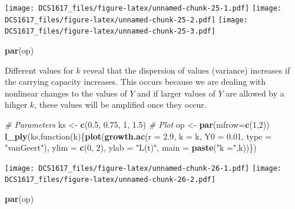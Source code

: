 \documentclass[]{book}
\newenvironment{Shaded}{\begin{snugshade}}{\end{snugshade}}
\newcommand{\KeywordTok}[1]{\textcolor[rgb]{0.13,0.29,0.53}{\textbf{{#1}}}}
\newcommand{\DataTypeTok}[1]{\textcolor[rgb]{0.13,0.29,0.53}{{#1}}}
\newcommand{\DecValTok}[1]{\textcolor[rgb]{0.00,0.00,0.81}{{#1}}}
\newcommand{\FloatTok}[1]{\textcolor[rgb]{0.00,0.00,0.81}{{#1}}}
\newcommand{\StringTok}[1]{\textcolor[rgb]{0.31,0.60,0.02}{{#1}}}
\newcommand{\CommentTok}[1]{\textcolor[rgb]{0.56,0.35,0.01}{\textit{{#1}}}}
\newcommand{\NormalTok}[1]{{#1}}
\begin{document}
\texttt{[image: DCS1617\_files/figure-latex/unnamed-chunk-25-1.pdf]}
\texttt{[image: DCS1617\_files/figure-latex/unnamed-chunk-25-2.pdf]}
\texttt{[image: DCS1617\_files/figure-latex/unnamed-chunk-25-3.pdf]}

\begin{Shaded}
\begin{Highlighting}[]
\KeywordTok{par}\NormalTok{(op)}
\end{Highlighting}
\end{Shaded}

Different values for \(k\) reveal that the dispersion of values
(variance) increases if the carrying capacity increases. This occurs
because we are dealing with nonlinear changes to the values of \(Y\) and
if larger values of \(Y\) are allowed by a hihger \(k\), these values
will be amplified once they occur.

\begin{Shaded}
\begin{Highlighting}[]
\CommentTok{# Parameters}
\NormalTok{ks <-}\StringTok{ }\KeywordTok{c}\NormalTok{(}\FloatTok{0.5}\NormalTok{, }\FloatTok{0.75}\NormalTok{, }\DecValTok{1}\NormalTok{, }\FloatTok{1.5}\NormalTok{)}
\CommentTok{# Plot }
\NormalTok{op <-}\StringTok{ }\KeywordTok{par}\NormalTok{(}\DataTypeTok{mfrow=}\KeywordTok{c}\NormalTok{(}\DecValTok{1}\NormalTok{,}\DecValTok{2}\NormalTok{))}
\KeywordTok{l_ply}\NormalTok{(ks,function(k)\{}\KeywordTok{plot}\NormalTok{(}\KeywordTok{growth.ac}\NormalTok{(}\DataTypeTok{r =} \FloatTok{2.9}\NormalTok{, }\DataTypeTok{k =} \NormalTok{k, }\DataTypeTok{Y0 =} \FloatTok{0.01}\NormalTok{, }\DataTypeTok{type =} \StringTok{"vanGeert"}\NormalTok{),}
                          \DataTypeTok{ylim =} \KeywordTok{c}\NormalTok{(}\DecValTok{0}\NormalTok{, }\DecValTok{2}\NormalTok{), }\DataTypeTok{ylab =} \StringTok{"L(t)"}\NormalTok{, }\DataTypeTok{main =} \KeywordTok{paste}\NormalTok{(}\StringTok{"k ="}\NormalTok{,k))\})}
\end{Highlighting}
\end{Shaded}

\texttt{[image: DCS1617\_files/figure-latex/unnamed-chunk-26-1.pdf]}
\texttt{[image: DCS1617\_files/figure-latex/unnamed-chunk-26-2.pdf]}

\begin{Shaded}
\begin{Highlighting}[]
\KeywordTok{par}\NormalTok{(op)}
\end{Highlighting}
\end{Shaded}
\end{document}
